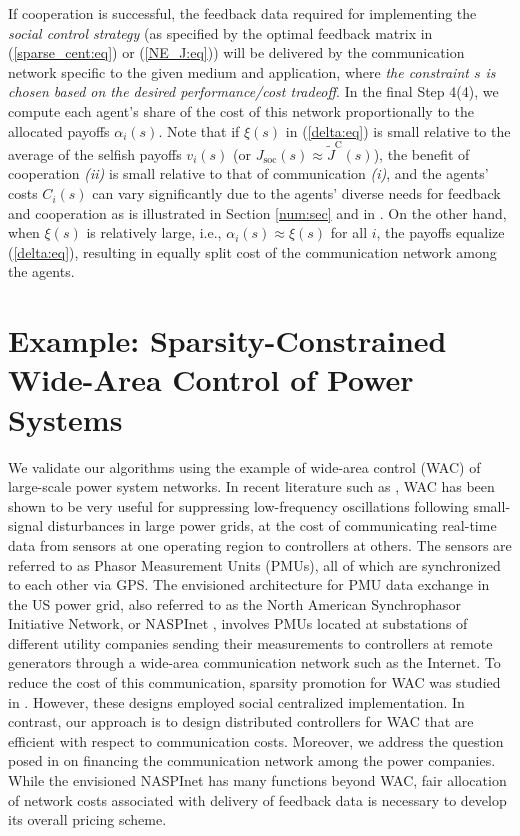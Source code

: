 \documentclass[12pt, draftclsnofoot,onecolumn]{IEEEtran}
\begin{document}
If cooperation is successful, the feedback data required for implementing the {\it social control strategy} (as specified by the optimal feedback matrix in (\ref{sparse_cent:eq}) or (\ref{NE_J:eq})) will be delivered by the communication network specific to the given medium and application, where {\it the constraint $s$ is chosen based on the desired performance/cost tradeoff}. In the final Step 4(4), we compute each agent's share of the cost of this network proportionally to the allocated payoffs $\alpha_i(s)$. Note that if $\xi(s)$ in (\ref{delta:eq}) is small relative to the average of the selfish payoffs $v_i(s)$ (or $J_{\mathrm{soc}}(s) \approx \tilde J^{\mathrm{C}}(s)$), the benefit of cooperation {\it (ii)} is small relative to that of communication {\it (i)}, and the agents' costs $C_i(s)$ can vary significantly due to the agents' diverse needs for feedback and cooperation as is illustrated in Section \ref{num:sec} and in \cite{lianensuring}. On the other hand, when $\xi(s)$ is relatively large, i.e., $\alpha_i(s)\approx \xi(s)$ for all $i$, the payoffs equalize (\ref{delta:eq}), resulting in equally split cost of the communication network among the agents.


\section{Example: Sparsity-Constrained Wide-Area Control of Power Systems}

\label{WAC:sec}
We validate our algorithms using the example of wide-area control (WAC) of large-scale power system networks. In recent literature such as \cite{dorjovchebulTPS14,pramod}, WAC has been shown to be very useful for suppressing low-frequency oscillations following small-signal disturbances in large power grids, at the cost of communicating real-time data from sensors at one operating region to controllers at others. The sensors are referred to as Phasor Measurement Units (PMUs), all of which are synchronized to each other via GPS. The envisioned architecture for PMU data exchange in the US power grid, also referred to as the North American Synchrophasor Initiative Network, or NASPInet \cite{naspinet}, involves PMUs located at substations of different utility companies sending their measurements to controllers at remote generators through a wide-area communication network such as the Internet. To reduce the cost of this communication, sparsity promotion for WAC was studied in \cite{dorjovchebulTPS14,lin2013design}. However, these designs employed social centralized implementation. In contrast, our approach is to design distributed controllers for WAC that are efficient with respect to communication costs. Moreover, we address the question posed in \cite{naspinet} on financing the communication network among the power companies. While the envisioned NASPInet has many functions beyond WAC, fair allocation of network costs associated with delivery of feedback data is necessary to develop its overall pricing scheme.
\end{document}
